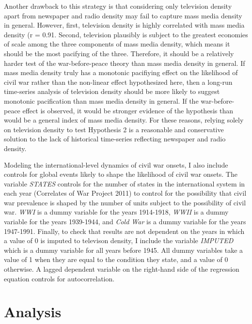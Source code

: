 \documentclass[11pt,article,oneside]{memoir}
\begin{document}
Another drawback to this strategy is that considering only television
density apart from newspaper and radio density may fail to capture mass
media density in general. However, first, television density is highly
correlated with mass media density (r = 0.91. Second, television
plausibly is subject to the greatest economies of scale among the three
components of mass media density, which means it should be the most
pacifying of the three. Therefore, it should be a relatively harder test
of the war-before-peace theory than mass media density in general. If
mass media density truly has a monotonic pacifiying effect on the
likelihood of civil war rather than the non-linear effect hypothesized
here, then a long-run time-series analysis of television density should
be more likely to suggest monotonic pacification than mass media density
in general. If the war-before-peace effect is observed, it would be
stronger evidence of the hypothesis than would be a general index of
mass media density. For these reasons, relying solely on television
density to test Hypothesis 2 is a reasonable and conservative solution
to the lack of historical time-series reflecting newspaper and radio
density.

Modeling the international-level dynamics of civil war onsets, I also
include controls for global events likely to shape the likelihood of
civil war onsets. The variable \emph{STATES} controls for the number of
states in the international system in each year (Correlates of War
Project 2011) to control for the possibility that civil war prevalence
is shaped by the number of units subject to the possibility of civil
war. \emph{WWI} is a dummy variable for the years 1914-1918, \emph{WWII}
is a dummy variable for the years 1939-1944, and \emph{Cold War} is a
dummy variable for the years 1947-1991. Finally, to check that results
are not dependent on the years in which a value of 0 is imputed to
televison density, I include the variable \emph{IMPUTED} which is a
dummy variable for all years before 1945. All dummy variables take a
value of 1 when they are equal to the condition they state, and a value
of 0 otherwise. A lagged dependent variable on the right-hand side of
the regression equation controls for autocorrelation.

\section{Analysis}\label{analysis}
\end{document}
